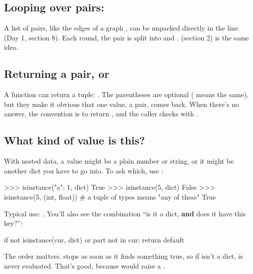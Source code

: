 \documentclass[10pt,a4paper]{article}
\begin{document}
\subsection{Looping over pairs: }
A list of pairs, like the edges of a graph , can be unpacked directly in the  line (Day 1, section 8). Each round, the pair is split into  and .  (section 2) is the same idea.
\subsection{Returning a pair, or }
A function can return a tuple: . The parentheses are optional ( means the same), but they make it obvious that one value, a pair, comes back. When there’s no answer, the convention is to return , and the caller checks with .
\subsection{What kind of value is this? }
With nested data, a value might be a plain number or string, or it might be another dict you have to go into. To ask which, use :
\begin{txtcode}
>>> isinstance({"a": 1}, dict)
True
>>> isinstance(5, dict)
False
>>> isinstance(5, (int, float))        # a tuple of types means "any of these"
True
\end{txtcode}
Typical use: .
You’ll also see the combination “is it a dict, \textbf{and} does it have this key?”:
\begin{pycode}
if not isinstance(cur, dict) or part not in cur:
    return default
\end{pycode}
The order matters.  stops as soon as it finds something true, so if  isn’t a dict,  is never evaluated. That’s good, because  would raise a .
\end{document}
